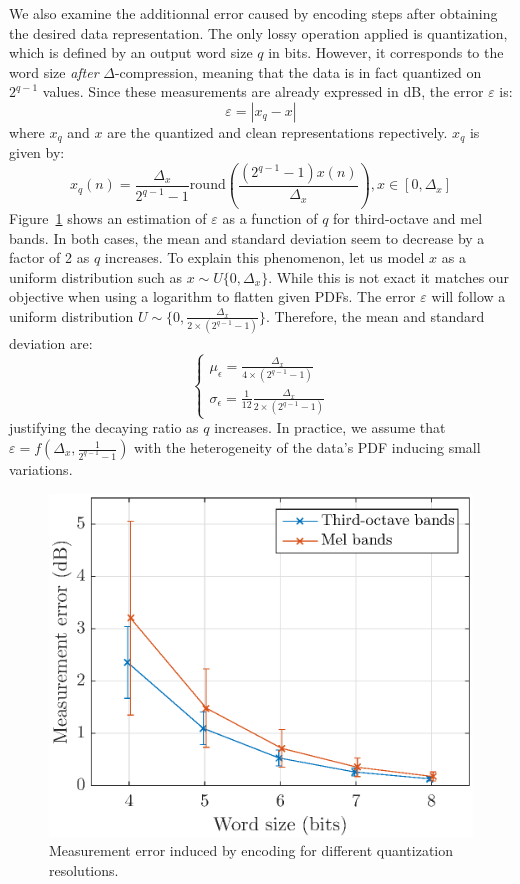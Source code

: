 \documentclass[final,3p,times,twocolumn]{elsarticle}
\begin{document}
We also examine the additionnal error caused by encoding steps after obtaining the desired data representation. The only lossy operation applied is quantization, which is defined by an output word size $q$ in bits. However, it corresponds to the word size \textit{after} $\Delta$-compression, meaning that the data is in fact quantized on $2^{q-1}$ values. Since these measurements are already expressed in dB, the error $\varepsilon$ is:
\begin{equation*}
	\varepsilon = |x_q-x|
\end{equation*}
where $x_q$ and $x$ are the quantized and clean representations repectively. $x_q$ is given by:
\begin{equation*}
x_q(n) = \frac{\Delta_x}{2^{q-1}-1}\textrm{round}\left(\frac{(2^{q-1}-1)x(n)}{\Delta_x}\right), x\in \left[0, \Delta_x\right]
\end{equation*}
Figure~\ref{fig:error_q} shows an estimation of $\varepsilon$ as a function of $q$ for third-octave and mel bands. In both cases, the mean and standard deviation seem to decrease by a factor of 2 as $q$ increases. To explain this phenomenon, let us model $x$ as a uniform distribution such as $x\sim \textit{U}\{0, \Delta_x\}$. While this is not exact it matches our objective when using a logarithm to flatten given PDFs. The error $\varepsilon$ will follow a uniform distribution $U\sim \{0, \frac{\Delta_x}{2\times (2^{q-1}-1)}\}$. Therefore, the mean and standard deviation are:
\[
\begin{cases}
	\mu_\epsilon = \frac{\Delta_x}{4\times (2^{q-1}-1)}\\
	\sigma_\epsilon = \frac{1}{12}\frac{\Delta_x}{2\times (2^{q-1}-1)}
\end{cases}
\]
justifying the decaying ratio as $q$ increases. In practice, we assume that $\varepsilon = f(\Delta_x, \frac{1}{2^{q-1}-1})$ with the heterogeneity of the data's PDF inducing small variations.\\

\begin{figure}[htbp]
	\centering
		\includegraphics[width=\columnwidth]{error_qall.eps}
	\caption{Measurement error induced by encoding for different quantization resolutions.}
	\label{fig:error_q}
\end{figure}
\end{document}
